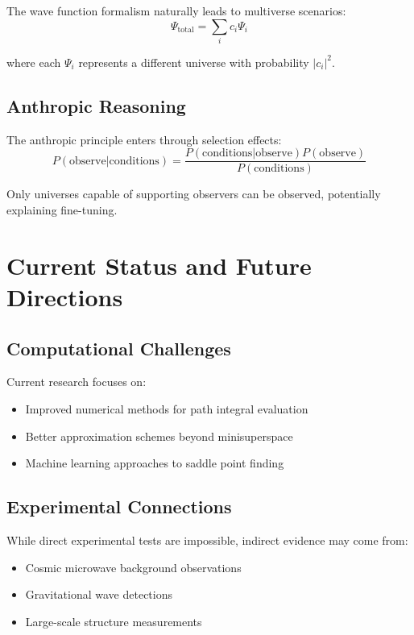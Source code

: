 \documentclass[12pt,a4paper]{article}
\begin{document}
The wave function formalism naturally leads to multiverse scenarios:
\begin{equation}
\Psi_{\text{total}} = \sum_i c_i \Psi_i
\end{equation}

where each $\Psi_i$ represents a different universe with probability $|c_i|^2$.

\subsection{Anthropic Reasoning}

The anthropic principle enters through selection effects:
\begin{equation}
P(\text{observe}|\text{conditions}) = \frac{P(\text{conditions}|\text{observe})P(\text{observe})}{P(\text{conditions})}
\end{equation}

Only universes capable of supporting observers can be observed, potentially explaining fine-tuning.

\section{Current Status and Future Directions}

\subsection{Computational Challenges}

Current research focuses on:
\begin{itemize}
    \item Improved numerical methods for path integral evaluation
    \item Better approximation schemes beyond minisuperspace
    \item Machine learning approaches to saddle point finding
\end{itemize}

\subsection{Experimental Connections}

While direct experimental tests are impossible, indirect evidence may come from:
\begin{itemize}
    \item Cosmic microwave background observations
    \item Gravitational wave detections
    \item Large-scale structure measurements
\end{itemize}
\end{document}
